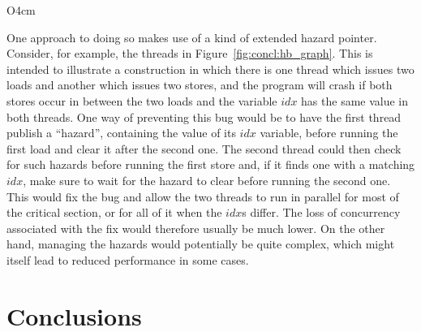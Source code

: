 \begin{wrapfigure}{O}{4cm}
  \vspace{-12pt}
  \vspace{-12pt}
\end{wrapfigure}
One approach to doing so makes use of a kind of extended hazard
pointer\cite{Michael2004}.  Consider, for example, the threads in
Figure~\ref{fig:concl:hb_graph}.  This is intended to illustrate a
construction in which there is one thread which issues two loads and
another which issues two stores, and the program will crash if both
stores occur in between the two loads and the variable $\mathit{idx}$
has the same value in both threads.  One way of preventing this bug
would be to have the first thread publish a ``hazard'', containing the
value of its $\mathit{idx}$ variable, before running the first load
and clear it after the second one.  The second thread could then check
for such hazards before running the first store and, if it finds one
with a matching $\mathit{idx}$, make sure to wait for the hazard to
clear before running the second one.  This would fix the bug and allow
the two threads to run in parallel for most of the critical section,
or for all of it when the $\mathit{idx}$s differ.  The loss of
concurrency associated with the fix would therefore usually be much
lower.  On the other hand, managing the hazards would potentially be
quite complex, which might itself lead to reduced performance in some
cases.

\section{Conclusions}

